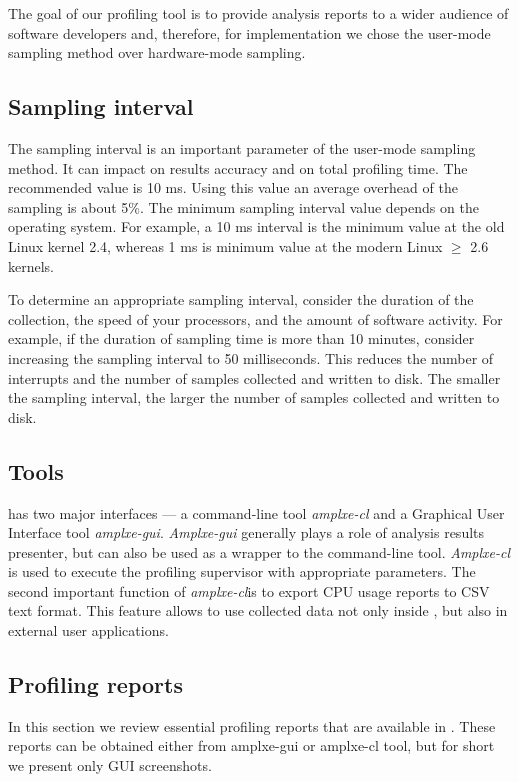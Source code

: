 \documentclass[a4paper]{jpconf}
\begin{document}
The goal of our profiling tool is to provide analysis reports to a wider audience of software developers and, therefore, 
for implementation we chose the user-mode sampling method over hardware-mode sampling.

\subsection{Sampling interval}

The sampling interval is an important parameter of the user-mode sampling method. It can impact on results accuracy and 
on total profiling time. The recommended value is 10 ms. Using this value an average overhead of the sampling 
is about 5\%.  The minimum sampling interval value depends on the operating system. For example, a 10 ms interval 
is the minimum value at the old Linux kernel 2.4, whereas 1 ms is minimum value at the modern Linux $\ge$ 2.6 kernels.

To determine an appropriate sampling interval, consider the duration of the collection, the speed of your processors, 
and the amount of software activity. For example, if the duration of sampling time is more than 10 minutes, 
consider increasing the sampling interval to 50 milliseconds. This reduces the number of interrupts and 
the number of samples collected and written to disk. The smaller the sampling interval, the larger the number of samples 
collected and written to disk.

\subsection{Tools}

\amp has two major interfaces --- a command-line tool {\it amplxe-cl} and a Graphical User Interface 
tool {\it amplxe-gui}. {\it Amplxe-gui} generally plays a role of analysis results presenter, but can also be used as 
a wrapper to the  command-line tool. {\it Amplxe-cl} is used to execute the profiling supervisor with appropriate 
parameters.  The second important function of {\it amplxe-cl}is to export CPU usage reports to CSV text format. 
This feature allows to use collected data not only inside \amp, but also in external user applications. 

\subsection{Profiling reports}

In this section we review essential profiling reports that are available in \amp. These reports can be obtained either 
from amplxe-gui or amplxe-cl tool, but for short we present only GUI screenshots.
\end{document}
